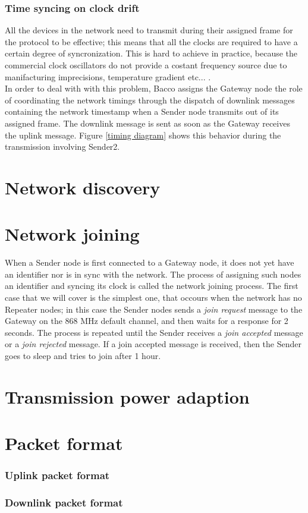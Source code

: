 \subsubsection{Time syncing on clock drift}
All the devices in the network need to transmit during their assigned frame for the protocol to be effective; this means
that all the clocks are required to have a certain degree of syncronization. This is hard to achieve in
practice, because the commercial clock oscillators do not provide a costant frequency source due to manifacturing imprecisions,
temperature gradient etc... .\\
In order to deal with with this problem, Bacco assigns the Gateway node the role of coordinating the network timings through
the dispatch of downlink messages containing the network timestamp when a Sender
node transmits out of its assigned frame. The downlink message is sent as soon as the Gateway receives the uplink
message. Figure \ref{timing diagram} shows this behavior during the transmission involving Sender2.

\section{Network discovery}
\label{Network discovery}


\section{Network joining}
When a Sender node is first connected to a Gateway node, it does not yet have an identifier nor is in sync with the
network. The process of assigning such nodes an identifier and syncing its clock is called the network joining process.
The first case that we will cover is the simplest one, that occours when the network has no Repeater nodes; in this case
the Sender nodes sends a \textit{join request} message to the Gateway on the 868 MHz default channel, and then waits for
a response for 2 seconds. The process is repeated until the Sender receives a \textit{join accepted} message or a
\textit{join rejected} message. If a join accepted message is received, then the Sender goes to sleep and tries to join
after 1 hour. 


\section{Transmission power adaption}

\section{Packet format}

\subsubsection{Uplink packet format}

\subsubsection{Downlink packet format}
